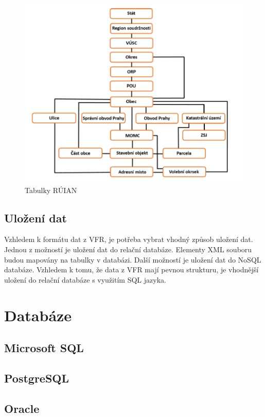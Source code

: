 \documentclass[czech, kiv, ba, he, iso690alph, pdf]{fasthesis}
\begin{document}
\pagebreak
\begin{figure}[H]
    \centering
    \includegraphics[width=\textwidth]{figures/ruian_tables.png}
    \caption{Tabulky RÚIAN}
    \label{fig:ruian_tables}
\end{figure}

\section{Uložení dat}
Vzhledem k formátu dat z VFR, je potřeba vybrat vhodný způsob uložení dat.
Jednou z možností je uložení dat do relační databáze.
Elementy XML souboru budou mapovány na tabulky v databázi.
Další možností je uložení dat do NoSQL databáze.
Vzhledem k tomu, že data z VFR mají pevnou strukturu, je vhodnější uložení do relační databáze s využitím SQL jazyka.

\chapter{Databáze}
\section{Microsoft SQL}
\section{PostgreSQL}
\section{Oracle}
\end{document}
